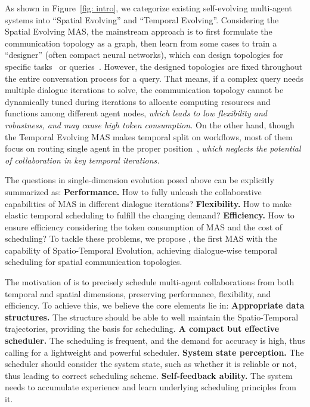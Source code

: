 As shown in Figure~\ref{fig: intro}, we categorize existing self-evolving multi-agent systems into ``Spatial Evolving'' and ``Temporal Evolving''. Considering the Spatial Evolving MAS, the mainstream approach is to first formulate the communication topology as a graph, then learn from some cases to train a ``designer'' (often compact neural networks), which can design topologies for specific tasks~\citep{liu2023dynamic,zhuge2024gptswarm} or queries~\citep{GDesigner,li2025assemble,zhang2025safesieve}. However, the designed topologies are fixed throughout the entire conversation process for a query. That means, if a complex query needs multiple dialogue iterations to solve, the communication topology cannot be dynamically tuned during iterations to allocate computing resources and functions among different agent nodes, \textit{which leads to low flexibility and robustness, and may cause high token consumption.} On the other hand, though the Temporal Evolving MAS makes temporal split on workflows, most of them focus on routing single agent in the proper position~\citep{niu2025flow,zhangaflow,lee2025confidence}, \textit{which neglects the potential of collaboration in key temporal iterations.} 

The questions in single-dimension evolution posed above can be explicitly summarized as:  \textbf{Performance.} How to fully unleash the collaborative capabilities of MAS in different dialogue iterations?  \textbf{Flexibility.} How to make elastic temporal scheduling to fulfill the changing demand?  \textbf{Efficiency.} How to ensure efficiency considering the token consumption of MAS and the cost of scheduling? To tackle these problems, we propose \ourmethod, the first MAS with the capability of Spatio-Temporal Evolution, achieving dialogue-wise temporal scheduling for spatial communication topologies. 

The motivation of \ourmethod is to precisely schedule multi-agent collaborations from both temporal and spatial dimensions, preserving performance, flexibility, and efficiency. To achieve this, we believe the core elements lie in:  \textbf{Appropriate data structures.} The structure should be able to well maintain the Spatio-Temporal trajectories, providing the basis for scheduling.  \textbf{A compact but effective scheduler.} The scheduling is frequent, and the demand for accuracy is high, thus calling for a lightweight and powerful scheduler.  \textbf{System state perception.} The scheduler should consider the system state, such as whether it is reliable or not, thus leading to correct scheduling scheme.  \textbf{Self-feedback ability.} The system needs to accumulate experience and learn underlying scheduling principles from it.

